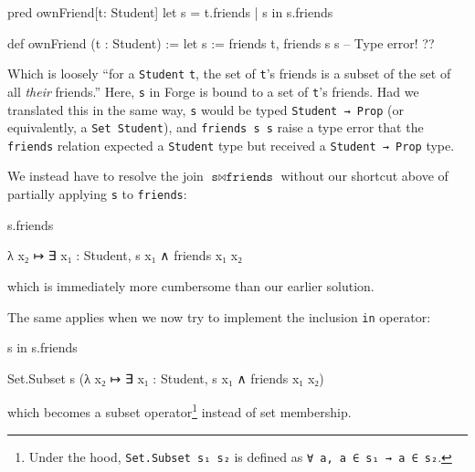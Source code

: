 \vspace{0.5em}
\noindent\begin{minipage}{0.5\textwidth}
\begin{forge*}
pred ownFriend[t: Student] {
  let s = t.friends |
    s in s.friends
}
\end{forge*}
\end{minipage}%
\begin{minipage}{0.5\textwidth}
\begin{lean*}
def ownFriend (t : Student) := 
  let s := friends t, 
    friends s s -- Type error!
?\phantom{}?
\end{lean*}
\end{minipage}
\vspace{0.5em}\newline
Which is loosely ``for a \texttt{Student} \texttt{t}, the set of \texttt{t}'s friends is a subset of the set of all \emph{their} friends.'' Here, \texttt{s} in Forge is bound to a set of \texttt{t}'s friends. Had we translated this in the same way, \texttt{s} would be typed \texttt{Student → Prop} (or equivalently, a \texttt{Set Student}), and \texttt{friends s s} raise a type error that the \texttt{friends} relation expected a \texttt{Student} type but received a \texttt{Student → Prop} type. 

We instead have to resolve the join $\texttt{s} \bowtie \texttt{friends}$ without our shortcut above of partially applying \texttt{s} to \texttt{friends}: 

\vspace{0.5em}
\noindent\begin{minipage}{0.3\textwidth}
\begin{forge*}
s.friends
\end{forge*}
\end{minipage}%
\begin{minipage}{0.7\textwidth}
\begin{lean*}
λ x₂ ↦ ∃ x₁ : Student, s x₁ ∧ friends x₁ x₂
\end{lean*}
\end{minipage}
\vspace{0.5em}\newline
which is immediately more cumbersome than our earlier solution. 

The same applies when we now try to implement the inclusion \texttt{in} operator: 

\vspace{0.5em}
\noindent\begin{minipage}{0.3\textwidth}
\begin{forge*}
s in s.friends
\end{forge*}
\end{minipage}%
\begin{minipage}{0.7\textwidth}
\begin{lean*}
Set.Subset s (λ x₂ ↦ ∃ x₁ : Student, s x₁ ∧ friends x₁ x₂)
\end{lean*}
\end{minipage}
\vspace{0.5em}\newline
which becomes a subset operator\footnote{Under the hood, \texttt{Set.Subset s₁ s₂} is defined as \texttt{∀ a, a ∈ s₁ → a ∈ s₂}.} instead of set membership. 

